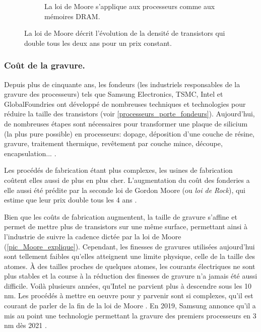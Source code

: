 \begin{figure}
\begin{subfigure}[]{0.48\linewidth}
                \caption{La loi de Moore s'applique aux processeurs comme aux mémoires DRAM.}
                \label{processeurs_porte_moore_dram}
            \end{subfigure}
            \caption{La loi de Moore décrit l'évolution de la densité de transistors qui double tous les deux ans pour un prix constant.}
            \label{fig_processeurs_moore}
        \end{figure}
        
        
    
    
    
    \subsubsection{Coût de la gravure.}
    
        Depuis plus de cinquante ans, les fondeurs (les industriels responsables de la gravure des processeurs) tels que Samsung Electronics, TSMC, Intel et GlobalFoundries ont développé de nombreuses techniques et technologies pour réduire la taille des transistors (voir \autoref{processeurs_porte_fondeurs}). Aujourd'hui, de nombreuses étapes sont nécessaires pour transformer une plaque de silicium (la plus pure possible) en processeurs: dopage, déposition d'une couche de résine, gravure, traitement thermique, revêtement par couche mince, découpe, encapsulation... \cite{AnthonyNelzinSantos2018}.
        
        Les procédés de fabrication étant plus complexes, les usines de fabrication coûtent elles aussi de plus en plus cher. L'augmentation du coût des fonderies a elle aussi été prédite par la seconde loi de Gordon Moore (ou \textit{loi de Rock}), qui estime que leur prix double tous les 4 ans \cite{schaller1997moore}. 
        
        Bien que les coûts de fabrication augmentent, la taille de gravure s’affine et permet de mettre plus de transistors sur une même surface, permettant ainsi à l’industrie de suivre la cadence dictée par la loi de Moore (\autoref{pic_Moore_explique}). Cependant, les finesses de gravures utilisées aujourd'hui sont tellement faibles qu'elles atteignent une limite physique, celle de la taille des atomes. À des tailles proches de quelques atomes, les courants électriques ne sont plus stables et la course à la réduction des finesses de gravure n'a jamais été aussi difficile. Voilà plusieurs années, qu'Intel ne parvient plus à descendre sous les 10 nm. Les procédés à mettre en oeuvre pour y parvenir sont si complexes, qu'il est courant de parler de la fin de la loi de Moore \cite{theis2017end}. En 2019, Samsung annonce qu'il a mis au point une technologie permettant la gravure des premiers processeurs en 3 nm dès 2021 \cite{AdrianBRANCO2019}. 
        

